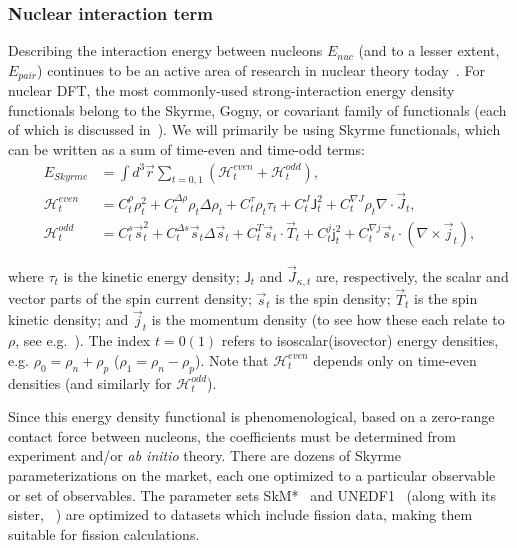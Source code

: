 \subsubsection{Nuclear interaction term}\label{sect:skyrmeterm}
Describing the interaction energy between nucleons $E_{nuc}$ (and to a lesser extent, $E_{pair}$) continues to be an active area of research in nuclear theory today~\cite{Machleidt2011,Machleidt2016,Epelbaum2009,Detmold2015,Stroberg2019}. For nuclear DFT, the most commonly-used strong-interaction energy density functionals belong to the Skyrme, Gogny, or covariant family of functionals (each of which is discussed in~\cite{bender2003}). We will primarily be using Skyrme functionals, which can be written as a sum of time-even and time-odd terms:
\begin{align}
E_{Skyrme} &= \int d^3\vec{r} \sum_{t=0,1} \left( \mathcal{H}^{even}_t + \mathcal{H}^{odd}_t \right),\\
\mathcal{H}^{even}_t &= C^\rho_t\rho_t^2 + C_t^{\Delta\rho}\rho_t\Delta\rho_t + C^\tau_t\rho_t\tau_t + C^J_t\mathsf{J}^2_t + C^{\nabla J}_t\rho_t\nabla\cdot\vec{J}_t, \\
\mathcal{H}^{odd}_t &= C^s_t \vec{s}_t^2 + C_t^{\Delta s}\vec{s}_t\Delta\vec{s}_t + C^T_t\vec{s}_t\cdot\vec{T}_t + C^j_t\mathsf{j}^2_t + C^{\nabla j}_t\vec{s}_t\cdot(\nabla\times\vec{j}_t),
\end{align}

\noindent where $\tau_t$ is the kinetic energy density; $\mathsf{J}_t$ and $\vec{J}_{\kappa,t}$ are, respectively, the scalar and vector parts of the spin current density; $\vec{s}_t$ is the spin density; $\vec{T}_t$ is the spin kinetic density; and $\vec{j}_t$ is the momentum density (to see how these each relate to $\rho$, see e.g.~\cite{bender2003}). The index $t=0(1)$ refers to isoscalar(isovector) energy densities, e.g. $\rho_0 = \rho_n + \rho_p$ ($\rho_1 = \rho_n - \rho_p$). Note that $\mathcal{H}^{even}_t$ depends only on time-even densities (and similarly for $\mathcal{H}^{odd}_t$).

Since this energy density functional is phenomenological, based on a zero-range contact force between nucleons, the coefficients must be determined from experiment and/or \textit{ab initio} theory. There are dozens of Skyrme parameterizations on the market, each one optimized to a particular observable or set of observables. The parameter sets SkM*~\cite{Bartel1982} and UNEDF1~\cite{Kortelainen2012} (along with its sister, {\hfb}~\cite{Schunck2015}) are optimized to datasets which include fission data, making them suitable for fission calculations.

